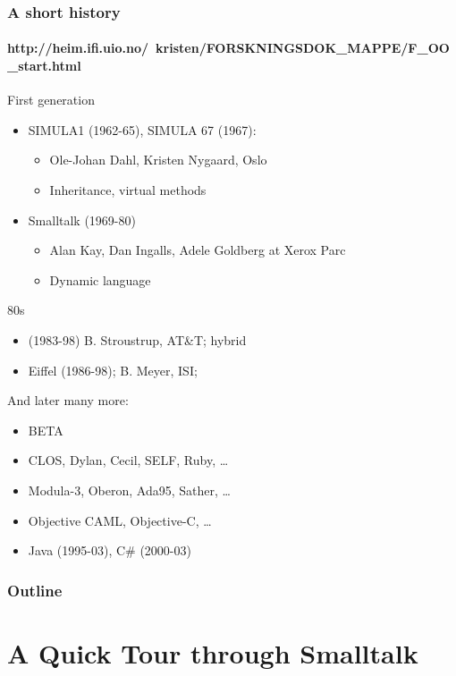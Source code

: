 \documentclass{beamer}
\begin{document}
\begin{frame}[fragile]
\frametitle{A short history}
\framesubtitle{http://heim.ifi.uio.no/~kristen/FORSKNINGSDOK_MAPPE/F_OO_start.html}
First generation
\begin{itemize}
\item SIMULA1 (1962-65), SIMULA 67 (1967): 
\begin{itemize}
\item Ole-Johan Dahl, Kristen Nygaard, Oslo
\item Inheritance, virtual methods
\end{itemize}
\item Smalltalk (1969-80) 
\begin{itemize}
\item Alan Kay, Dan Ingalls, Adele Goldberg at Xerox Parc
\item Dynamic language %
\end{itemize}
\end{itemize}

80s
\begin{itemize}
\item \cpp(1983-98)
B. Stroustrup, AT\&T; hybrid
\item Eiffel (1986-98); B. Meyer, ISI; %

\end{itemize}

And later many more:
\begin{itemize}
\item BETA
\item CLOS, Dylan, Cecil, SELF, Ruby, \ldots
\item  Modula-3, Oberon, Ada95, Sather, \ldots
\item Objective CAML, Objective-C, \ldots
\item Java (1995-03),
C\# (2000-03)


\end{itemize}

\end{frame}




\begin{frame}
  \frametitle{Outline}
  \tableofcontents
\end{frame}

\section{A Quick Tour through Smalltalk}
\end{document}
